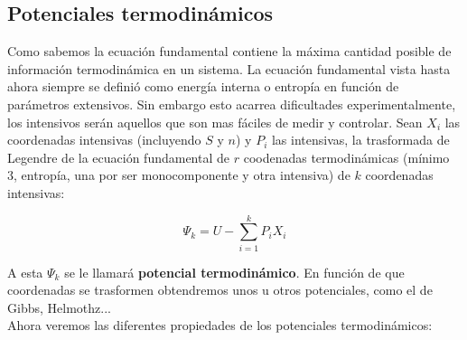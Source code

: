\documentclass[12pt,a4paper]{article}
\begin{document}
\subsection{Potenciales termodinámicos}
Como sabemos la ecuación fundamental contiene la máxima cantidad posible de información termodinámica en un sistema. La ecuación fundamental vista hasta ahora siempre se definió como energía interna o entropía en función de parámetros extensivos. Sin embargo esto acarrea dificultades experimentalmente, los intensivos serán aquellos que son mas fáciles de medir y controlar. Sean $X_i$ las coordenadas intensivas (incluyendo $S$ y $n$) y $P_i$ las intensivas, la trasformada de Legendre de la ecuación fundamental de $r$ coodenadas termodinámicas (mínimo 3, entropía, una por ser monocomponente y otra intensiva) de $k$ coordenadas intensivas:
 
 
\begin{equation}
\Psi_k = U - \sum_{i=1}^k P_i X_i
\end{equation}

A esta $\Psi_k$ se le llamará \textbf{potencial termodinámico}. En función de que coordenadas se trasformen obtendremos unos u otros potenciales, como el de Gibbs, Helmothz... \\

Ahora veremos las diferentes propiedades de los potenciales termodinámicos:
\end{document}
